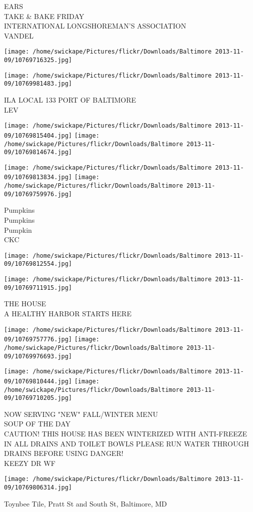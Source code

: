 \documentclass[10pt,letterpaper]{article}
\begin{document}
EARS\\
TAKE \& BAKE FRIDAY\\
INTERNATIONAL LONGSHOREMAN'S ASSOCIATION\\
VANDEL\\
\pagebreak

\texttt{[image: /home/swickape/Pictures/flickr/Downloads/Baltimore 2013-11-09/10769716325.jpg]}

\vspace{0.25in}
\texttt{[image: /home/swickape/Pictures/flickr/Downloads/Baltimore 2013-11-09/10769981483.jpg]}

ILA LOCAL 133 PORT OF BALTIMORE\\
LEV\\
\pagebreak

\texttt{[image: /home/swickape/Pictures/flickr/Downloads/Baltimore 2013-11-09/10769815404.jpg]}
\texttt{[image: /home/swickape/Pictures/flickr/Downloads/Baltimore 2013-11-09/10769814674.jpg]}

\texttt{[image: /home/swickape/Pictures/flickr/Downloads/Baltimore 2013-11-09/10769813834.jpg]}
\texttt{[image: /home/swickape/Pictures/flickr/Downloads/Baltimore 2013-11-09/10769759976.jpg]}

Pumpkins\\
Pumpkins\\
Pumpkin\\
CKC\\
\pagebreak

\texttt{[image: /home/swickape/Pictures/flickr/Downloads/Baltimore 2013-11-09/10769812554.jpg]}

\vspace{0.25in}
\texttt{[image: /home/swickape/Pictures/flickr/Downloads/Baltimore 2013-11-09/10769711915.jpg]}

THE HOUSE\\
A HEALTHY HARBOR STARTS HERE\\
\pagebreak

\texttt{[image: /home/swickape/Pictures/flickr/Downloads/Baltimore 2013-11-09/10769757776.jpg]}
\texttt{[image: /home/swickape/Pictures/flickr/Downloads/Baltimore 2013-11-09/10769976693.jpg]}

\texttt{[image: /home/swickape/Pictures/flickr/Downloads/Baltimore 2013-11-09/10769810444.jpg]}
\texttt{[image: /home/swickape/Pictures/flickr/Downloads/Baltimore 2013-11-09/10769710205.jpg]}

NOW SERVING "NEW" FALL/WINTER MENU\\
SOUP OF THE DAY\\
CAUTION! THIS HOUSE HAS BEEN WINTERIZED WITH ANTI{-}FREEZE IN ALL DRAINS AND TOILET BOWLS PLEASE RUN WATER THROUGH DRAINS BEFORE USING DANGER!\\
KEEZY DR WF\\
\pagebreak

\texttt{[image: /home/swickape/Pictures/flickr/Downloads/Baltimore 2013-11-09/10769806314.jpg]}

Toynbee Tile, Pratt St and South St, Baltimore, MD\\
\pagebreak
\end{document}
